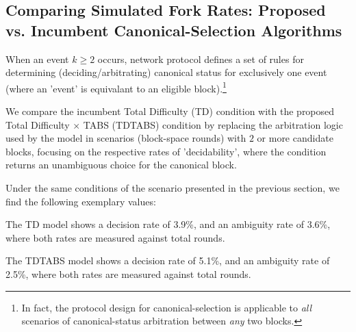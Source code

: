 \documentclass[11pt]{article}
\theoremstyle{plain}
\newcommand{\comment}[1]{}
\begin{document}
{\subsection{\normalsize{
    Comparing Simulated Fork Rates:
    Proposed vs. Incumbent Canonical-Selection Algorithms
}}

When an event $k \geq 2$ occurs, network protocol defines a set of rules for
determining (deciding/arbitrating) canonical status for exclusively one event
(where an 'event' is equivalant to an eligible block).\footnote{
  In fact, the protocol design for canonical-selection is applicable to \emph{all}
  scenarios of canonical-status arbitration between \emph{any} two blocks.
}

We compare the incumbent Total Difficulty (TD) condition with the proposed
Total Difficulty $\times$ TABS (TDTABS) condition by replacing the arbitration
logic used by the model in scenarios (block-space rounds) with $2$ or more
candidate blocks, focusing on the respective rates of 'decidability', where
the condition returns an unambiguous choice for the canonical block.

Under the same conditions of the scenario presented in the previous section,
we find the following exemplary values:




The TD model shows a decision rate of 3.9\%, and an ambiguity rate of 3.6\%,
where both rates are measured against total rounds.

The TDTABS model shows a decision rate of 5.1\%, and an ambiguity rate of 2.5\%,
where both rates are measured against total rounds.







}
\end{document}

